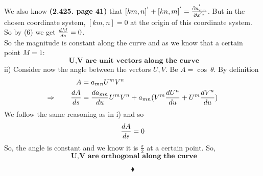 We also know \textbf{(2.425. page 41)} that $[km,n]^{'} + [kn,m]^{'} = \pdv{a^{'}_{mn}}{x^{'k}}$. But in the chosen coordinate system, $[km,n] = 0$ at the origin of this coordinate system. So by (6) we get $\dv{M}{s} = 0$.\\
So the magnitude is constant along the curve and as we know that a certain point $M =1$:\\
$$\textbf{ U,V are unit vectors along the curve}$$\newpage
ii) Consider now the angle between the vectors $U,V$. Be $A = \cos \ \theta$. By definition 
\begin{align}
\ A &= a_{mn}U ^mV^n\\
\Rightarrow \quad\quad \dv{A}{s} &= \dv{a_{mn}}{u}U^m V^n + a_{mn}(V^m \dv{U^n}{u} +U^m \dv{V^n}{u} )
\end{align}
We follow the same reasoning as in i) and so
$$\dv{A}{s} = 0$$
So, the angle is constant and we know it is $\frac{\pi}{2}$ at a certain point. So,
$$\textbf{ U,V are orthogonal along the curve}$$

$$\blacklozenge$$
\newpage

